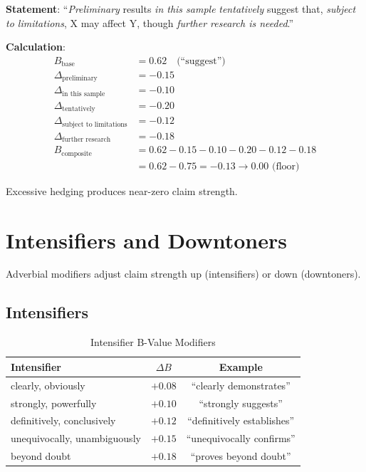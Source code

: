 \documentclass[11pt,a4paper]{article}
\theoremstyle{remark}
\begin{document}
\begin{examplebox}[title={Cumulative Hedging Effect}]
\textbf{Statement}: ``\textit{Preliminary} results \textit{in this sample} \textit{tentatively} suggest that, \textit{subject to limitations}, X may affect Y, though \textit{further research is needed}.''

\textbf{Calculation}:
\begin{align}
B_{\text{base}} &= 0.62 \quad \text{(``suggest'')} \\
\Delta_{\text{preliminary}} &= -0.15 \\
\Delta_{\text{in this sample}} &= -0.10 \\
\Delta_{\text{tentatively}} &= -0.20 \\
\Delta_{\text{subject to limitations}} &= -0.12 \\
\Delta_{\text{further research}} &= -0.18 \\
\hline
B_{\text{composite}} &= 0.62 - 0.15 - 0.10 - 0.20 - 0.12 - 0.18 \\
&= 0.62 - 0.75 = -0.13 \to 0.00 \text{ (floor)}
\end{align}

Excessive hedging produces near-zero claim strength.
\end{examplebox}


\section{Intensifiers and Downtoners}
\label{sec:intensifiers}

Adverbial modifiers adjust claim strength up (intensifiers) or down (downtoners).

\subsection{Intensifiers}

\begin{table}[h]
\centering
\caption{Intensifier B-Value Modifiers}
\label{tab:intensifiers}
\begin{tabular}{lcc}
\toprule
\textbf{Intensifier} & \textbf{$\Delta B$} & \textbf{Example} \\
\midrule
clearly, obviously & $+0.08$ & ``clearly demonstrates'' \\
strongly, powerfully & $+0.10$ & ``strongly suggests'' \\
definitively, conclusively & $+0.12$ & ``definitively establishes'' \\
unequivocally, unambiguously & $+0.15$ & ``unequivocally confirms'' \\
beyond doubt & $+0.18$ & ``proves beyond doubt'' \\
\bottomrule
\end{tabular}
\end{table}
\end{document}
